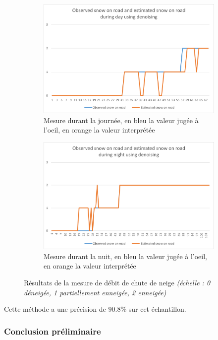\begin{figure}[H]
\begin{subfigure}{.45\textwidth}
        \includegraphics[width=\linewidth]{Images/computer_vision/snowOnRoad/dayResults_noNoise.png}
        \caption{Mesure durant la journée, en bleu la valeur jugée à l'oeil, en orange la valeur interprétée}
        \label{fig:SnowOnRoad_noNoise_dayResults}
    \end{subfigure}
    \hfill
    \begin{subfigure}{.45\textwidth}
        \includegraphics[width=\linewidth]{Images/computer_vision/snowOnRoad/nightResults_noNoise.png}
        \caption{Mesure durant la nuit, en bleu la valeur jugée à l'oeil, en orange la valeur interprétée}
        \label{fig:SnowOnRoad_noNoise_nightResults}
    \end{subfigure}
    \caption{Résultats de la mesure de débit de chute de neige \emph{(échelle : 0 déneigée, 1 partiellement enneigée, 2 enneigée)}}
    \label{fig:SnowOnRoad_noNoise_results}
\end{figure}
Cette méthode a une précision de $90.8\%$ sur cet échantillon.


\subsubsection{Conclusion préliminaire}